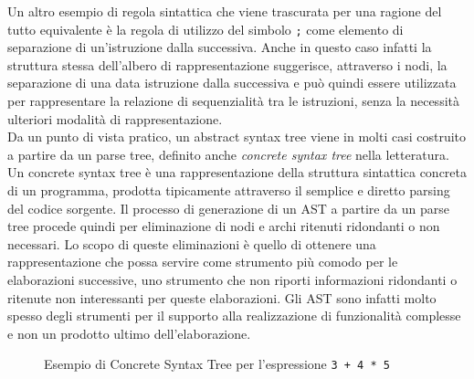 Un altro esempio di regola sintattica che viene trascurata per una ragione del
tutto equivalente è la regola di utilizzo del simbolo \texttt{;} come elemento
di separazione di un’istruzione dalla successiva. Anche in questo caso infatti
la struttura stessa dell’albero di rappresentazione suggerisce, attraverso i
nodi, la separazione di una data istruzione dalla successiva e può quindi essere
utilizzata per rappresentare la relazione di sequenzialità tra le istruzioni,
senza la necessità ulteriori modalità di rappresentazione.\\

Da un punto di vista pratico, un abstract syntax tree viene in molti casi
costruito a partire da un parse tree, definito anche \textit{concrete syntax
tree} nella letteratura. Un concrete syntax tree è una rappresentazione della
struttura sintattica concreta di un programma, prodotta tipicamente attraverso
il semplice e diretto parsing del codice sorgente. Il processo di generazione di
un AST a partire da un parse tree procede quindi per eliminazione di nodi e
archi ritenuti ridondanti o non necessari. Lo scopo di queste eliminazioni è
quello di ottenere una rappresentazione che possa servire come strumento più
comodo per le elaborazioni successive, uno strumento che non riporti
informazioni ridondanti o ritenute non interessanti per queste elaborazioni. Gli
AST sono infatti molto spesso degli strumenti per il supporto alla realizzazione
di funzionalità complesse e non un prodotto ultimo dell’elaborazione.

\begin{figure}
\caption{Esempio di Concrete Syntax Tree per l'espressione \texttt{3 + 4 * 5}}
\label{fig:concrete-syntax-tree}
\end{figure}

